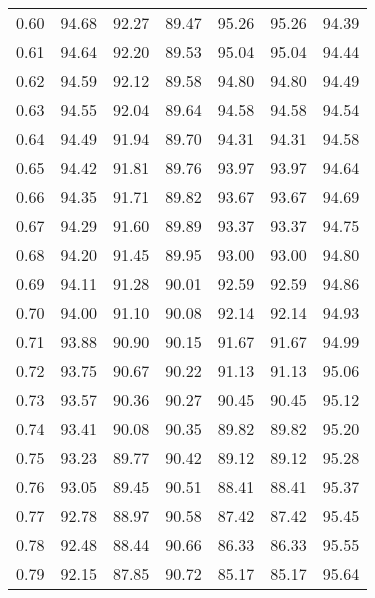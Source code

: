 \begin{tabular}{|c|c|c|c|c|c|c|}
      0.60 &     94.68 &     92.27 &      89.47 &   95.26 &      95.26 &         94.39 \\
      0.61 &     94.64 &     92.20 &      89.53 &   95.04 &      95.04 &         94.44 \\
      0.62 &     94.59 &     92.12 &      89.58 &   94.80 &      94.80 &         94.49 \\
      0.63 &     94.55 &     92.04 &      89.64 &   94.58 &      94.58 &         94.54 \\
      0.64 &     94.49 &     91.94 &      89.70 &   94.31 &      94.31 &         94.58 \\
      0.65 &     94.42 &     91.81 &      89.76 &   93.97 &      93.97 &         94.64 \\
      0.66 &     94.35 &     91.71 &      89.82 &   93.67 &      93.67 &         94.69 \\
      0.67 &     94.29 &     91.60 &      89.89 &   93.37 &      93.37 &         94.75 \\
      0.68 &     94.20 &     91.45 &      89.95 &   93.00 &      93.00 &         94.80 \\
      0.69 &     94.11 &     91.28 &      90.01 &   92.59 &      92.59 &         94.86 \\
      0.70 &     94.00 &     91.10 &      90.08 &   92.14 &      92.14 &         94.93 \\
      0.71 &     93.88 &     90.90 &      90.15 &   91.67 &      91.67 &         94.99 \\
      0.72 &     93.75 &     90.67 &      90.22 &   91.13 &      91.13 &         95.06 \\
      0.73 &     93.57 &     90.36 &      90.27 &   90.45 &      90.45 &         95.12 \\
      0.74 &     93.41 &     90.08 &      90.35 &   89.82 &      89.82 &         95.20 \\
      0.75 &     93.23 &     89.77 &      90.42 &   89.12 &      89.12 &         95.28 \\
      0.76 &     93.05 &     89.45 &      90.51 &   88.41 &      88.41 &         95.37 \\
      0.77 &     92.78 &     88.97 &      90.58 &   87.42 &      87.42 &         95.45 \\
      0.78 &     92.48 &     88.44 &      90.66 &   86.33 &      86.33 &         95.55 \\
      0.79 &     92.15 &     87.85 &      90.72 &   85.17 &      85.17 &         95.64 \\

\end{tabular}
